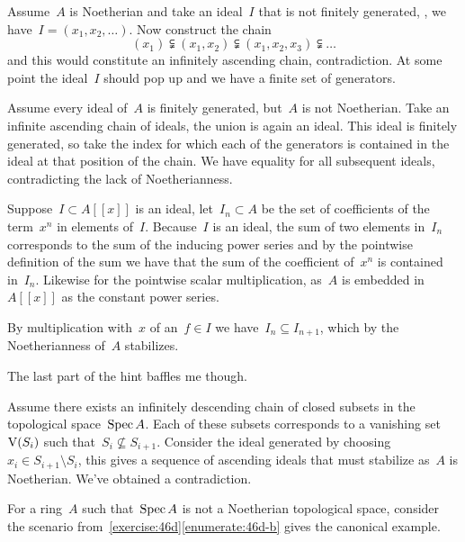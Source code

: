 \begin{exercise}
  Assume~$A$ is Noetherian and take an ideal~$I$ that is not finitely generated, \ie, we have~$I=(x_1,x_2,\ldots)$. Now construct the chain
  \begin{equation}
    (x_1)\subsetneqq(x_1,x_2)\subsetneqq(x_1,x_2,x_3)\subsetneqq\ldots
  \end{equation}
  and this would constitute an infinitely ascending chain, contradiction. At some point the ideal~$I$ should pop up and we have a finite set of generators.

  Assume every ideal of~$A$ is finitely generated, but~$A$ is not Noetherian. Take an infinite ascending chain of ideals, the union is again an ideal. This ideal is finitely generated, so take the index for which each of the generators is contained in the ideal at that position of the chain. We have equality for all subsequent ideals, contradicting the lack of Noetherianness.
\end{exercise}

\begin{exercise} %
  Suppose~$I\subset A[[x]]$ is an ideal, let~$I_n\subset A$ be the set of coefficients of the term~$x^n$ in elements of~$I$. Because~$I$ is an ideal, the sum of two elements in~$I_n$ corresponds to the sum of the inducing power series and by the pointwise definition of the sum we have that the sum of the coefficient of~$x^n$ is contained in~$I_n$. Likewise for the pointwise scalar multiplication, as~$A$ is embedded in~$A[[x]]$ as the constant power series.

  By multiplication with~$x$ of an~$f\in I$ we have~$I_n\subseteq I_{n+1}$, which by the Noetherianness of~$A$ stabilizes.

  The last part of the hint baffles me though.
\end{exercise}

\begin{exercise}
  Assume there exists an infinitely descending chain of closed subsets in the topological space~$\operatorname{Spec} A$. Each of these subsets corresponds to a vanishing set~$\operatorname{V}(S_i)$ such that~$S_i\nsubseteq S_{i+1}$. Consider the ideal generated by choosing~$x_i\in S_{i+1}\setminus S_i$, this gives a sequence of ascending ideals that must stabilize as~$A$ is Noetherian. We've obtained a contradiction.

  For a ring~$A$ such that~$\operatorname{Spec} A$ is not a Noetherian topological space, consider the scenario from~\autoref{exercise:46d}\ref{enumerate:46d-b} gives the canonical example.
\end{exercise}

